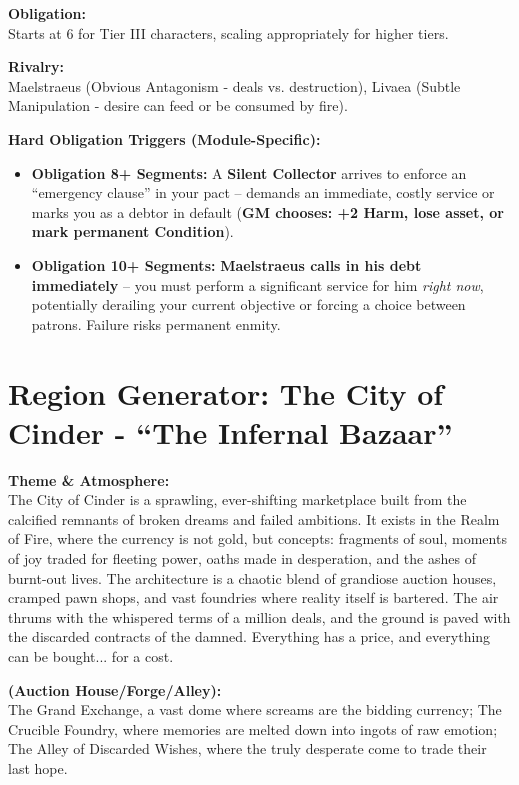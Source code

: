 \documentclass[11pt,letterpaper]{article}
\newcommand{\patronbox}[1]{\noindent\textbf{#1}\\}
\begin{document}
\patronbox{Obligation:} Starts at 6 for Tier III characters, scaling appropriately for higher tiers.

\patronbox{Rivalry:} Maelstraeus (Obvious Antagonism - deals vs. destruction), Livaea (Subtle Manipulation - desire can feed or be consumed by fire).

\patronbox{Hard Obligation Triggers (Module-Specific):}
\begin{itemize}[leftmargin=*]
    \item \textbf{Obligation 8+ Segments:} A \textbf{Silent Collector} arrives to enforce an ``emergency clause'' in your pact -- demands an immediate, costly service or marks you as a debtor in default (\textbf{GM chooses: +2 Harm, lose asset, or mark permanent Condition}).
    \item \textbf{Obligation 10+ Segments:} \textbf{Maelstraeus calls in his debt immediately} -- you must perform a significant service for him \textit{right now}, potentially derailing your current objective or forcing a choice between patrons. Failure risks permanent enmity.
\end{itemize}

\newpage

\section{Region Generator: The City of Cinder - ``The Infernal Bazaar''}

\patronbox{Theme \& Atmosphere:} The City of Cinder is a sprawling, ever-shifting marketplace built from the calcified remnants of broken dreams and failed ambitions. It exists in the Realm of Fire, where the currency is not gold, but concepts: fragments of soul, moments of joy traded for fleeting power, oaths made in desperation, and the ashes of burnt-out lives. The architecture is a chaotic blend of grandiose auction houses, cramped pawn shops, and vast foundries where reality itself is bartered. The air thrums with the whispered terms of a million deals, and the ground is paved with the discarded contracts of the damned. Everything has a price, and everything can be bought... for a cost.

\patronbox{(Auction House/Forge/Alley):} The Grand Exchange, a vast dome where screams are the bidding currency; The Crucible Foundry, where memories are melted down into ingots of raw emotion; The Alley of Discarded Wishes, where the truly desperate come to trade their last hope.
\end{document}
